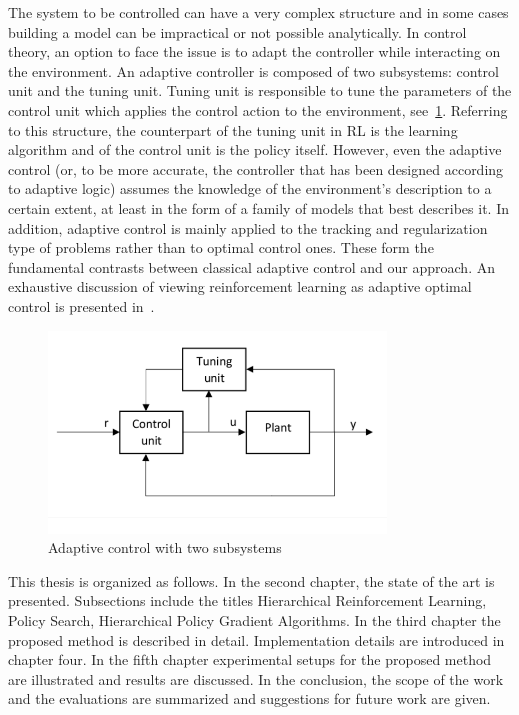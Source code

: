 The system to be controlled can have a very complex structure and in some cases building a model can be impractical or not possible analytically. In control theory, an option to face the issue is to adapt the controller while interacting on the environment. An adaptive controller is composed of two subsystems: control unit and the tuning unit. Tuning unit is responsible to tune the parameters of the control unit which applies the control action to the environment, see~\ref{fig:adaptivecontrol}.
Referring to this structure, the counterpart of the tuning unit in RL is the learning algorithm and of the control unit is the policy itself.  However, even the adaptive control (or, to be more accurate, the controller that has been designed according to adaptive logic) assumes the knowledge of the environment’s description to a certain extent, at least in the form of a family of models that best describes it. In addition, adaptive control is mainly applied to the tracking and regularization type of problems rather than to optimal control ones. These form the fundamental contrasts between classical adaptive control and our approach. An exhaustive discussion of viewing reinforcement learning as adaptive optimal control is presented in~\cite{Sutton1991ReinforcementLI}.
\begin{figure}[t]
      \centering
	  \includegraphics[width = 0.8\textwidth]{./pictures/adaptivecontrol.png}
      \caption{Adaptive control with two subsystems}
      \label{fig:adaptivecontrol}
\end{figure}

This thesis is organized as follows. 
In the second chapter, the state of the art is presented. Subsections include the titles Hierarchical Reinforcement Learning, Policy Search, Hierarchical Policy Gradient Algorithms.
In the third chapter the proposed method is described in detail. Implementation details are introduced in chapter four.
In the fifth chapter experimental setups for the proposed method are illustrated and results are discussed.
In the conclusion, the scope of the work and the evaluations are summarized and suggestions for future work are given.
